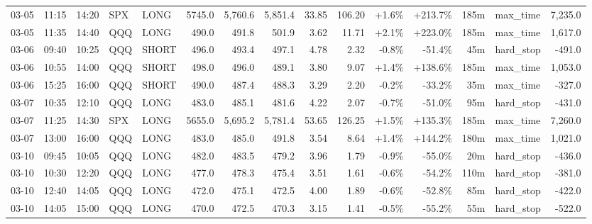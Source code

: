\documentclass[11pt,a4paper,twoside]{article}
\begin{document}
\begin{landscape}
\begin{center}
\begin{longtable}{>{\color{txtmain}}l l l l l r r r r r r r r >{\color{txtmain}}l r}
03-05 & 11:15 & 14:20 & SPX & LONG & 5745.0 & 5,760.6 & 5,851.4 & 33.85 & 106.20 & \textcolor{wingreen}{+1.6\%} & \textcolor{wingreen}{+213.7\%} & 185m & max\_time & \textcolor{wingreen}{7,235.0} \\
03-05 & 11:35 & 14:40 & QQQ & LONG & 490.0 & 491.8 & 501.9 & 3.62 & 11.71 & \textcolor{wingreen}{+2.1\%} & \textcolor{wingreen}{+223.0\%} & 185m & max\_time & \textcolor{wingreen}{1,617.0} \\
03-06 & 09:40 & 10:25 & QQQ & SHORT & 496.0 & 493.4 & 497.1 & 4.78 & 2.32 & \textcolor{lossred}{-0.8\%} & \textcolor{lossred}{-51.4\%} & 45m & hard\_stop & \textcolor{lossred}{-491.0} \\
03-06 & 10:55 & 14:00 & QQQ & SHORT & 498.0 & 496.0 & 489.1 & 3.80 & 9.07 & \textcolor{wingreen}{+1.4\%} & \textcolor{wingreen}{+138.6\%} & 185m & max\_time & \textcolor{wingreen}{1,053.0} \\
03-06 & 15:25 & 16:00 & QQQ & SHORT & 490.0 & 487.4 & 488.3 & 3.29 & 2.20 & \textcolor{lossred}{-0.2\%} & \textcolor{lossred}{-33.2\%} & 35m & max\_time & \textcolor{lossred}{-327.0} \\
03-07 & 10:35 & 12:10 & QQQ & LONG & 483.0 & 485.1 & 481.6 & 4.22 & 2.07 & \textcolor{lossred}{-0.7\%} & \textcolor{lossred}{-51.0\%} & 95m & hard\_stop & \textcolor{lossred}{-431.0} \\
03-07 & 11:25 & 14:30 & SPX & LONG & 5655.0 & 5,695.2 & 5,781.4 & 53.65 & 126.25 & \textcolor{wingreen}{+1.5\%} & \textcolor{wingreen}{+135.3\%} & 185m & max\_time & \textcolor{wingreen}{7,260.0} \\
03-07 & 13:00 & 16:00 & QQQ & LONG & 483.0 & 485.0 & 491.8 & 3.54 & 8.64 & \textcolor{wingreen}{+1.4\%} & \textcolor{wingreen}{+144.2\%} & 180m & max\_time & \textcolor{wingreen}{1,021.0} \\
03-10 & 09:45 & 10:05 & QQQ & LONG & 482.0 & 483.5 & 479.2 & 3.96 & 1.79 & \textcolor{lossred}{-0.9\%} & \textcolor{lossred}{-55.0\%} & 20m & hard\_stop & \textcolor{lossred}{-436.0} \\
03-10 & 10:30 & 12:20 & QQQ & LONG & 477.0 & 478.3 & 475.4 & 3.51 & 1.61 & \textcolor{lossred}{-0.6\%} & \textcolor{lossred}{-54.2\%} & 110m & hard\_stop & \textcolor{lossred}{-381.0} \\
03-10 & 12:40 & 14:05 & QQQ & LONG & 472.0 & 475.1 & 472.5 & 4.00 & 1.89 & \textcolor{lossred}{-0.6\%} & \textcolor{lossred}{-52.8\%} & 85m & hard\_stop & \textcolor{lossred}{-422.0} \\
03-10 & 14:05 & 15:00 & QQQ & LONG & 470.0 & 472.5 & 470.3 & 3.15 & 1.41 & \textcolor{lossred}{-0.5\%} & \textcolor{lossred}{-55.2\%} & 55m & hard\_stop & \textcolor{lossred}{-522.0} \\

\end{longtable}
\end{center}
\end{landscape}
\end{document}
